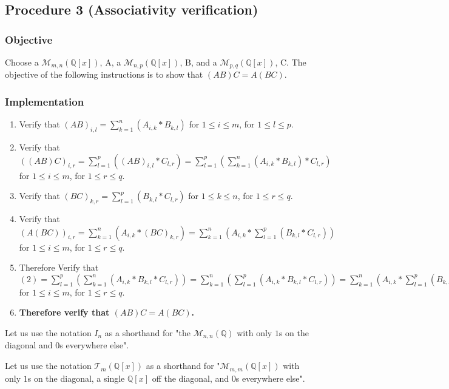 \documentclass[twocolumn]{article}
\begin{document}
		\subsection{Procedure 3 (Associativity verification)}\label{sec:procedure 3}
			\subsubsection{Objective}
				Choose a $\mathcal{M}_{m,n}(\mathbb{Q}[x])$, A, a $\mathcal{M}_{n,p}(\mathbb{Q}[x])$, B, and a $\mathcal{M}_{p,q}(\mathbb{Q}[x])$, C. The objective of the following instructions is to show that $(AB)C=A(BC)$.
			\subsubsection{Implementation}
				\begin{enumerate}
					\item Verify that $(AB)_{i,l}=\sum_{k=1}^{n} \left(A_{i,k}*B_{k,l}\right)$ for $1\le i\le m$, for $1\le l\le p$.
					\item Verify that $((AB)C)_{i,r}=\sum_{l=1}^{p} \left((AB)_{i,l}*C_{l,r}\right)=\sum_{l=1}^{p} \left(\sum_{k=1}^{n} \left(A_{i,k}*B_{k,l}\right)*C_{l,r}\right)$ for $1\le i\le m$, for $1\le r\le q$.
					\item Verify that $(BC)_{k,r}=\sum_{l=1}^{p}\left(B_{k,l}*C_{l,r}\right)$ for $1\le k\le n$, for $1\le r\le q$.
					\item Verify that $(A(BC))_{i,r}=\sum_{k=1}^{n}\left(A_{i,k}*(BC)_{k,r}\right)=\sum_{k=1}^{n}\left(A_{i,k}*\sum_{l=1}^{p}\left(B_{k,l}*C_{l,r}\right)\right)$ for $1\le i\le m$, for $1\le r\le q$.
					\item Therefore Verify that $(2)=\sum_{l=1}^{p} \left(\sum_{k=1}^{n} \left(A_{i,k}*B_{k,l}*C_{l,r}\right)\right)=\sum_{k=1}^{n} \left(\sum_{l=1}^{p} \left(A_{i,k}*B_{k,l}*C_{l,r}\right)\right)=\sum_{k=1}^{n}\left(A_{i,k}*\sum_{l=1}^{p}\left(B_{k,l}*C_{l,r}\right)\right)=(4)$ for $1\le i\le m$, for $1\le r\le q$.
					\item \textbf{Therefore verify that $(AB)C=A(BC)$.}
				\end{enumerate}
		Let us use the notation $I_n$ as a shorthand for "the $\mathcal{M}_{n,n}(\mathbb{Q})$ with only $1$s on the diagonal and $0$s everywhere else".
		
		Let us use the notation $\mathcal{T}_{m}(\mathbb{Q}[x])$ as a shorthand for "$\mathcal{M}_{m,m}(\mathbb{Q}[x])$ with only $1$s on the diagonal, a single $\mathbb{Q}[x]$ off the diagonal, and $0$s everywhere else".
		
\end{document}
